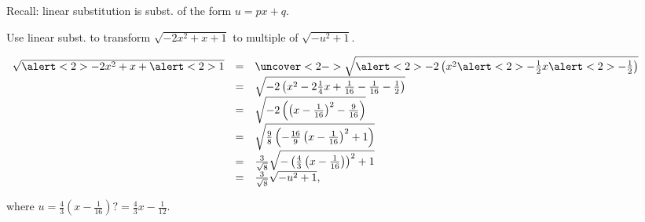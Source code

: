 \begin{frame}
Recall: linear substitution is subst. of the form $u=px+q$.
\begin{example}
Use linear subst. to transform $\sqrt{-2x^2+x+1}$ to multiple of $\sqrt{-u^2+1}$. 

\noindent 
$
\begin{array}{rcl}
\sqrt{\alert<2>{ -2}x^2+x+\alert<2>{1}}&=& \uncover<2->{ \sqrt{ \alert<2>{-2}\left(x^2\alert<2>{-\frac{1}{2}}x \alert<2>{-\frac{1}{2}}\right) }} \\
&=& \sqrt{ -2\left(x^2-2\frac{1}{4}x +\frac{1}{16}-\frac{1}{16}-\frac{1}{2}\right) }\\
&=&\sqrt{-2\left(\left(x-\frac{1}{16}\right)^2-\frac{9}{16} \right)}\\
&=&\sqrt{\frac{9}{8}\left(-\frac{16}{9}\left(x-\frac{1}{16}\right)^2+1 \right)}\\
&=&\frac{3}{\sqrt{8}}\sqrt{-\left(\frac{4}{3}\left(x-\frac{1}{16}\right)\right)^2+1 }\\
&=&\frac{ 3}{\sqrt{8}} \sqrt{-u^2+1},
\end{array}
$

\noindent where $u=\frac{4}{3}\left(x-\frac{1}{16}\right)  \textbf{?}=\frac{4}{3}x-\frac{1}{12}$.
\end{example}
\end{frame}
